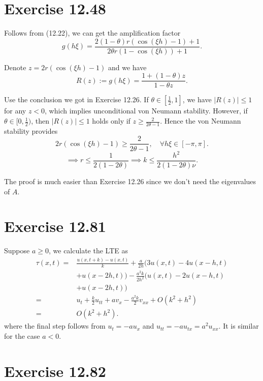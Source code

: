 \documentclass[twocolumn,10pt]{article}
\begin{document}
\section*{\large Exercise 12.48}

Follows from (12.22), we can get the amplification factor
\begin{equation*}
    g(h\xi)=\frac{2(1-\theta)r(\cos(\xi h)-1)+1}{2\theta r(1-\cos(\xi h))+1}.
\end{equation*}

Denote $z=2r(\cos(\xi h)-1)$ and we have
\begin{equation*}
    R(z):=g(h\xi)=\frac{1+(1-\theta)z}{1-\theta z}.
\end{equation*}

Use the conclusion we got in Exercise 12.26. If $\theta\in[\frac{1}{2},1]$, we have $|R(z)|\leq 1$ for any $z<0$, which implies unconditional von Neumann stability. However, if $\theta\in[0,\frac{1}{2})$, then $|R(z)|\leq 1$ holds only if $z\geq \frac{2}{2\theta-1}$. Hence the von Neumann stability provides
\begin{equation*}
    2r(\cos(\xi h)-1)\geq \frac{2}{2\theta-1},\quad \forall h\xi\in[-\pi,\pi].
\end{equation*}
\begin{equation*}
    \implies r\leq \frac{1}{2(1-2\theta)} \implies k\leq \frac{h^2}{2(1-2\theta)\nu}.
\end{equation*}

The proof is much easier than Exercise 12.26 since we don't need the eigenvalues of $A$.

\section*{\large Exercise 12.81}

Suppose $a\geq 0$, we calculate the LTE as
\begin{align*}
    \tau(x,t)=&\frac{u(x,t+k)-u(x,t)}{k}+\frac{a}{2h}(3u(x,t)-4u(x-h,t)\\
    &+u(x-2h,t))-\frac{a^2k}{2h^2}(u(x,t)-2u(x-h,t)\\&+u(x-2h,t))\\
    =& u_t+\frac{k}{2}u_{tt}+av_x-\frac{a^2k}{2}v_{xx}+O(k^2+h^2)\\
    =& O(k^2+h^2).
\end{align*}
where the final step follows from $u_t=-au_x$ and $u_{tt}=-au_{tx}=a^2u_{xx}$. It is similar for the case $a<0$.

\section*{\large Exercise 12.82}
\end{document}
